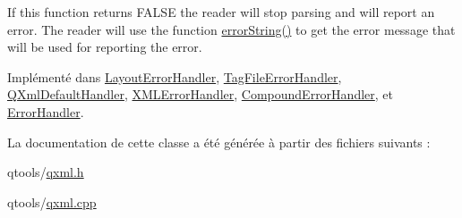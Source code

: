 If this function returns F\+A\+L\+S\+E the reader will stop parsing and will report an error. The reader will use the function \hyperlink{class_q_xml_error_handler_a7b265803d41782e6207b497fe09beff0}{error\+String()} to get the error message that will be used for reporting the error. 

Implémenté dans \hyperlink{class_layout_error_handler_a463dfca8796fee3c40a08817d1af64be}{Layout\+Error\+Handler}, \hyperlink{class_tag_file_error_handler_a5512c9023933b9a9a457f75f7654412a}{Tag\+File\+Error\+Handler}, \hyperlink{class_q_xml_default_handler_acaabb9885b0d301b151112ea3e05f361}{Q\+Xml\+Default\+Handler}, \hyperlink{class_x_m_l_error_handler_ae24e6692734e1075c74d0417c1678548}{X\+M\+L\+Error\+Handler}, \hyperlink{class_compound_error_handler_a80ccb953cac3ead66ae9c8892d8e3c03}{Compound\+Error\+Handler}, et \hyperlink{class_error_handler_abb147190a3d48dae251d7db795d9e28d}{Error\+Handler}.



La documentation de cette classe a été générée à partir des fichiers suivants \+:\begin{DoxyCompactItemize}
\item 
qtools/\hyperlink{qxml_8h}{qxml.\+h}\item 
qtools/\hyperlink{qxml_8cpp}{qxml.\+cpp}\end{DoxyCompactItemize}
